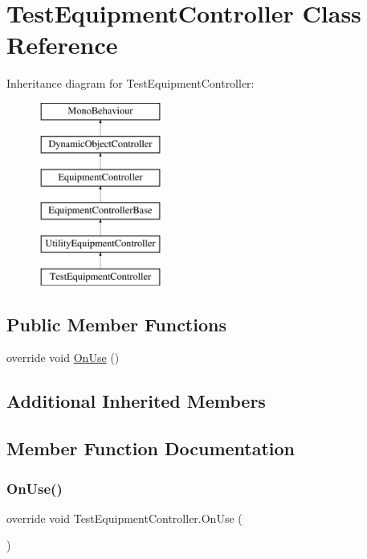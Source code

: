 \hypertarget{class_test_equipment_controller}{}\section{Test\+Equipment\+Controller Class Reference}
\label{class_test_equipment_controller}
Inheritance diagram for Test\+Equipment\+Controller\+:\begin{figure}[H]
\begin{center}
\leavevmode
\includegraphics[height=6.000000cm]{class_test_equipment_controller}
\end{center}
\end{figure}
\subsection*{Public Member Functions}
\begin{DoxyCompactItemize}
\item 
override void \mbox{\hyperlink{class_test_equipment_controller_a41d31b42f5b120a11a0816568214455a}{On\+Use}} ()
\end{DoxyCompactItemize}
\subsection*{Additional Inherited Members}


\subsection{Member Function Documentation}
\mbox{\label{class_test_equipment_controller_a41d31b42f5b120a11a0816568214455a}} 
\subsubsection{\texorpdfstring{On\+Use()}{OnUse()}}
{\footnotesize\ttfamily override void Test\+Equipment\+Controller.\+On\+Use (\begin{DoxyParamCaption}{ }\end{DoxyParamCaption})\hspace{0.3cm}{\ttfamily [virtual]}}



